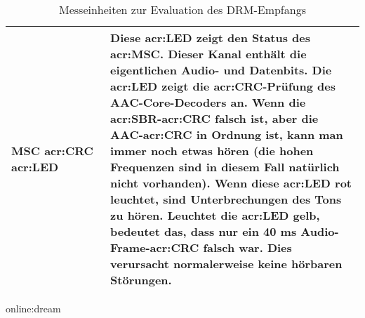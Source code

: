 \begin{table}[h]
\begin{center}
\begin{tabular}{|p{0.28\linewidth} | p{0.72\linewidth}|}
			\midrule
			\textbf{MSC \gls{acr:CRC} \gls{acr:LED}} & Diese \gls{acr:LED} zeigt den Status des \gls{acr:MSC}. Dieser Kanal enthält die eigentlichen Audio- und Datenbits. Die \gls{acr:LED} zeigt die \gls{acr:CRC}-Prüfung des AAC-Core-Decoders an.  Wenn die \gls{acr:SBR}-\gls{acr:CRC} falsch ist, aber die AAC-\gls{acr:CRC} in Ordnung ist, kann man immer noch etwas hören (die hohen Frequenzen sind in diesem Fall natürlich nicht vorhanden). Wenn diese \gls{acr:LED} rot leuchtet, sind Unterbrechungen des Tons zu hören. Leuchtet die \gls{acr:LED} gelb, bedeutet das, dass nur ein 40 ms Audio-Frame-\gls{acr:CRC} falsch war. Dies verursacht normalerweise keine hörbaren Störungen.\\
			\bottomrule
		\end{tabular}
		\caption{Messeinheiten zur Evaluation des DRM-Empfangs}
		\gls{online:dream}
		\label{tab:drmmess}
	\end{center}
\end{table}


